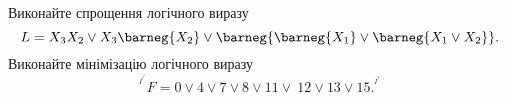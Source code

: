 %
%
^^I^^IВиконайте спрощення логічного виразу
^^I^^I\[
^^I^^I^^IL = X_3X_2 \lor X_3 \barneg{X_2} \lor \barneg{\barneg{X_1} \lor \barneg{X_1 \lor X_2} }.
^^I^^I\]
^^I^^IВиконайте мінімізацію логічного виразу
^^I^^I\[
^^I^^I^^IF = 0 \lor 4 \lor 7 \lor 8 \lor 11 \lor\ 12 \lor 13 \lor 15.
^^I^^I\]
